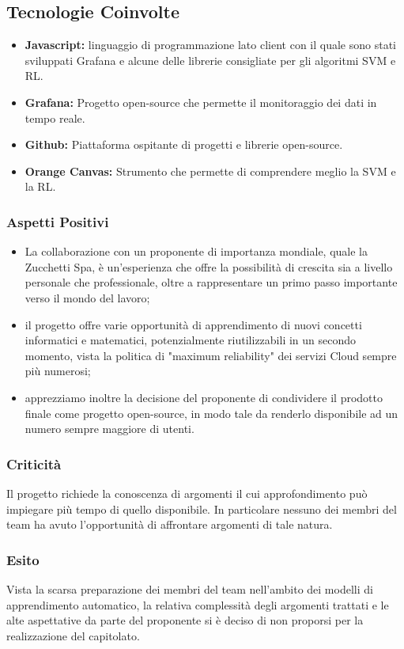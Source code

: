 	\subsection{Tecnologie Coinvolte}
	\begin{itemize}
		\item \textbf{Javascript}\textbf{:} linguaggio di programmazione lato client con il quale sono stati sviluppati Grafana e alcune delle librerie consigliate per gli algoritmi SVM e RL.
		\item \textbf{Grafana}\textbf{:} Progetto open-source che permette il monitoraggio dei dati in tempo reale.
		\item \textbf{Github}\textbf{:} Piattaforma ospitante di progetti e librerie open-source.
		\item \textbf{Orange Canvas}\textbf{:} Strumento che permette di comprendere meglio la SVM e la RL.
	\end{itemize}
	
	\subsubsection{Aspetti Positivi}
	\begin{itemize}
		\item La collaborazione con un proponente di importanza mondiale, quale la Zucchetti Spa, è un'esperienza che offre la possibilità di crescita sia a livello personale che professionale, oltre a rappresentare un primo passo importante verso il mondo del lavoro; 
		\item il progetto offre varie opportunità di apprendimento di nuovi concetti informatici e matematici, potenzialmente riutilizzabili in un secondo momento, vista la politica di "maximum reliability" dei servizi Cloud sempre più numerosi; 
		\item apprezziamo inoltre la decisione del proponente di condividere il prodotto finale come progetto open-source, in modo tale da renderlo disponibile ad un numero sempre maggiore di utenti.
	\end{itemize}

	\subsubsection{Criticità}
		Il progetto richiede la conoscenza di argomenti il cui approfondimento può impiegare più tempo di quello disponibile. In particolare nessuno dei membri del team ha avuto l'opportunità di affrontare argomenti di tale natura.
	
	\subsubsection{Esito}
		Vista la scarsa preparazione dei membri del team nell'ambito dei modelli di apprendimento automatico, la relativa complessità degli argomenti trattati e le alte aspettative da parte del proponente si è deciso di non proporsi per la realizzazione del capitolato.